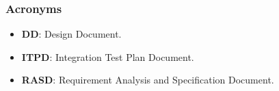 \subsubsection{Acronyms}

\begin{itemize}
	\item \textbf{DD}: Design Document.
	\item \textbf{ITPD}: Integration Test Plan Document.
	\item \textbf{RASD}: Requirement Analysis and Specification Document.
\end{itemize}
